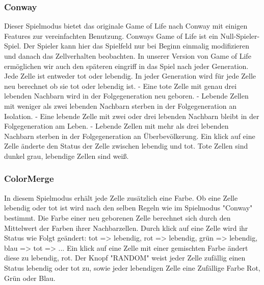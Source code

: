 \documentclass[12pt]{article}
\theoremstyle{plain}
\begin{document}
\begin{linenumbers}
\subsubsection{Conway}
Dieser Spielmodus bietet das originale Game of Life nach Conway mit einigen Features zur vereinfachten Benutzung. Conways Game of Life ist ein Null-Spieler-Spiel. Der Spieler kann hier das Spielfeld nur bei Beginn einmalig modifizieren und danach das Zellverhalten beobachten. In unserer Version von Game of Life ermöglichen wir auch den späteren eingriff in das Spiel nach jeder Generation.
\newline
Jede Zelle ist entweder tot oder lebendig. In jeder Generation wird für jede Zelle neu berechnet ob sie tot oder lebendig ist.
\newline
- Eine tote Zelle mit genau drei lebenden Nachbarn wird in der Folgegeneration neu geboren.
\newline
- Lebende Zellen mit weniger als zwei lebenden Nachbarn sterben in der Folgegeneration an Isolation.
\newline
- Eine lebende Zelle mit zwei oder drei lebenden Nachbarn bleibt in der Folgegeneration am Leben.
\newline
- Lebende Zellen mit mehr als drei lebenden Nachbarn sterben in der Folgegeneration an Überbevölkerung.
\newline
Ein klick auf eine Zelle änderte den Status der Zelle zwischen lebendig und tot. Tote Zellen sind dunkel grau, lebendige Zellen sind weiß.

\subsubsection{ColorMerge}
In diesem Spielmodus erhält jede Zelle zusätzlich eine Farbe. Ob eine Zelle lebendig oder tot ist wird nach den selben Regeln wie im Spielmodus "Conway" bestimmt. Die Farbe einer neu geborenen Zelle berechnet sich durch den Mittelwert der Farben ihrer Nachbarzellen.
\newline
Durch klick auf eine Zelle wird ihr Status wie Folgt geändert:
\newline
tot => lebendig, rot => lebendig, grün => lebendig, blau => tot => ...
\newline
Ein klick auf eine Zelle mit einer gemischten Farbe ändert diese zu lebendig, rot. Der Knopf "RANDOM" weist jeder Zelle zufällig einen Status lebendig oder tot zu, sowie jeder lebendigen Zelle eine Zufällige Farbe Rot, Grün oder Blau.


\end{linenumbers}
\end{document}
